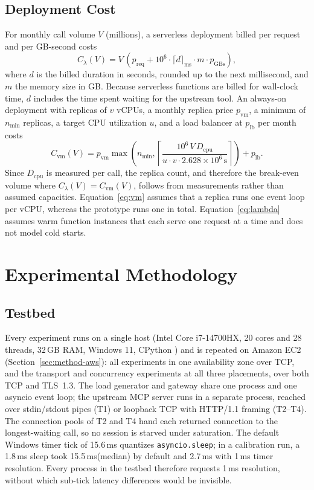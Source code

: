 \documentclass{ieeeaccess}
\newcommand{\ms}{\,ms\xspace}
\begin{document}
\subsection{Deployment Cost}
For monthly call volume $V$ (millions), a serverless deployment billed per request and per GB-second costs
\begin{equation}
C_{\lambda}(V) = V\,(p_{\mathrm{req}} + 10^{6} \cdot \lceil d \rceil_{\mathrm{ms}} \cdot m \cdot p_{\mathrm{GBs}}),
\label{eq:lambda}
\end{equation}
where $d$ is the billed duration in seconds, rounded up to the next millisecond, and $m$ the memory size in GB. Because serverless functions are billed for wall-clock time, $d$ includes the time spent waiting for the upstream tool. An always-on deployment with replicas of $v$ vCPUs, a monthly replica price $p_{\mathrm{vm}}$, a minimum of $n_{\min}$ replicas, a target CPU utilization $u$, and a load balancer at $p_{\mathrm{lb}}$ per month costs
\begin{equation}
C_{\mathrm{vm}}(V) = p_{\mathrm{vm}} \max\!\left(n_{\min}, \left\lceil \frac{10^6\, V\, D_{\mathrm{cpu}}}{u \cdot v \cdot 2.628\times 10^{6}\,\mathrm{s}} \right\rceil\right) + p_{\mathrm{lb}}.
\label{eq:vm}
\end{equation}
Since $D_{\mathrm{cpu}}$ is measured per call, the replica count, and therefore the break-even volume where $C_\lambda(V) = C_{\mathrm{vm}}(V)$, follows from measurements rather than assumed capacities. Equation~\eqref{eq:vm} assumes that a replica runs one event loop per vCPU, whereas the prototype runs one in total. Equation~\eqref{eq:lambda} assumes warm function instances that each serve one request at a time and does not model cold starts.

\section{Experimental Methodology}
\label{sec:method}

\subsection{Testbed}
Every experiment runs on a single host (Intel Core i7-14700HX, 20 cores and 28 threads, 32\,GB RAM, Windows 11, CPython \tbPython) and is repeated on Amazon EC2 (Section~\ref{sec:method-aws}): all experiments in one availability zone over TCP, and the transport and concurrency experiments at all three placements, over both TCP and TLS~1.3. The load generator and gateway share one process and one asyncio event loop; the upstream MCP server runs in a separate process, reached over stdin/stdout pipes (T1) or loopback TCP with HTTP/1.1 framing (T2--T4). The connection pools of T2 and T4 hand each returned connection to the longest-waiting call, so no session is starved under saturation. The default Windows timer tick of 15.6\ms quantizes \texttt{asyncio.sleep}; in a calibration run, a 1.8\ms sleep took 15.5\ms (median) by default and 2.7\ms with 1\ms timer resolution. Every process in the testbed therefore requests 1\ms resolution, without which sub-tick latency differences would be invisible.
\end{document}
